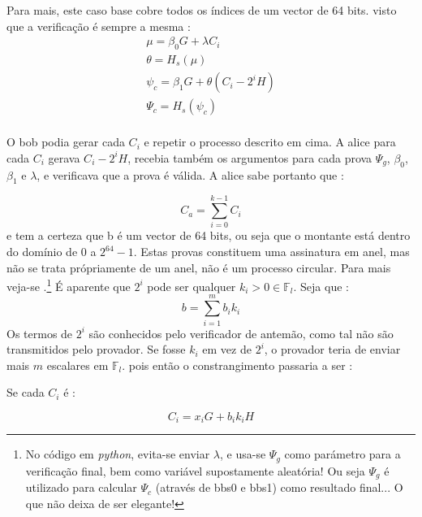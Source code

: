 Para mais, este caso base cobre todos os índices de um vector de 64 bits.
visto que a verificação é sempre a mesma :
\begin{align*}
\mu=\beta_0 G + \lambda C_i\\
\theta= H_s(\mu)\\
\psi_c = \beta_1 G + \theta (C_i - 2^i H)\\
\Psi_c = H_s(\psi_c)\\
\end{align*}

O bob podia gerar cada $C_i$ e repetir o processo descrito em cima. A alice para cada $C_i$ gerava $C_i -2^i H$, recebia também os argumentos para cada prova $\Psi_g$, $\beta_0$, $\beta_1$ e $\lambda$, e verificava que a prova é válida.
A alice sabe portanto que :

\vspace{.175cm}
\[C_{a} = \sum_{i=0}^{k-1} C_{i} \]
\vspace{.175cm}
\newline
e tem a certeza que b é um vector de 64 bits, ou seja que o montante está dentro do domínio de 0 a $2^{64} -1$. Estas provas constituem uma assinatura em anel, mas não se trata própriamente de um anel, não é um processo circular. Para mais veja-se \cite{DangerousFreedom1984} .\footnote{No código em {\em python}, evita-se enviar $\lambda$, e usa-se $\Psi_g$ como parámetro para a verificação final, bem como variável supostamente aleatória! Ou seja $\Psi_g$ é utilizado para calcular $\Psi_c$ (através de bbs0 e bbs1) como resultado final... O que não deixa de ser elegante! }
\newline\newline\newline
É aparente que $2^i$ pode ser qualquer $k_i>0 \in \mathbb{F}_l$.
Seja que :
\vspace{.175cm}
\[b = \sum_{i=1}^{m} b_i k_i \]
\vspace{.175cm}
\newline
Os termos de $2^i$ são conhecidos pelo verificador de antemão, como tal não são transmitidos pelo provador. Se fosse $k_i$ em vez de $2^i$, o provador teria de enviar mais $m$ escalares em $\mathbb{F}_l$. pois então o constrangimento passaria a ser :

Se cada $C_i$ é :

\vspace{.175cm}
\[C_{i} = x_i G + b_i k_i H \]
\vspace{.175cm}

